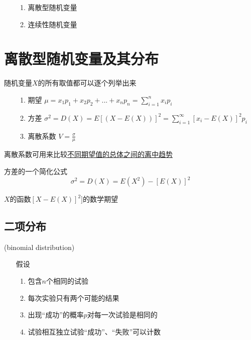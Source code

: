 \documentclass[UTF8,10pt]{book}
\begin{document}
            	
            	
                \begin{itemize}
                    \item [] {
                        \begin{enumerate}
                            \item 离散型随机变量
                            \item 连续性随机变量
                        \end{enumerate}
                    }
                \end{itemize}


    \section{离散型随机变量及其分布}
                {\kaishu 随机变量$X$的所有取值都可以逐个列举出来}

            \begin{itemize}
                    \item [] {
                        \begin{enumerate}
                            \item 期望 $ \mu = x_1p_1+x_2p_2+...+x_np_n=\sum_{i=1}^n x_ip_i $
                            \item 方差 $ \sigma^2 = D(X) = E[(X-E(X))]^2 = \sum_{i=1}^{\infty}[x_i-E(X)]^2p_i $
                            \item 离散系数 $ V = \frac{\sigma}{\mu} $
                        \end{enumerate}
                    }
                \end{itemize}

            {\kaishu 离散系数可用来比较\underline{不同期望值的总体之间的离中趋势}}

            {\kaishu 方差的一个简化公式}
                $$ \sigma^2 = D(X) = E(X^2) - [E(X)]^2 $$

            {$X$的函数$[X-E(X)]^2]$的数学期望}

        \subsection{二项分布}
                (binomial distribution)

            \begin{itemize}
                \item [假设] {
                    \begin{enumerate}
                        \item 包含$n$个相同的试验
                        \item 每次实验只有两个可能的结果
                        \item 出现“成功”的概率$p$对每一次试验是相同的
                        \item 试验相互独立试验“成功”、“失败”可以计数
                    \end{enumerate}
                }
            \end{itemize}
\end{document}
